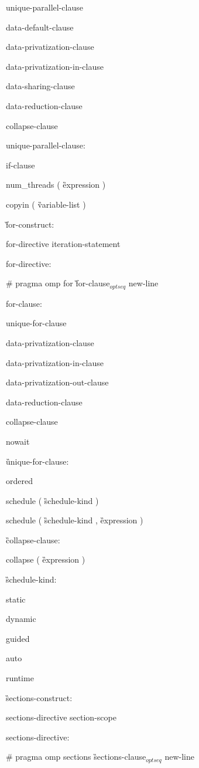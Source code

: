 {\I unique-parallel-clause

\I data-default-clause 

\I data-privatization-clause 

\I data-privatization-in-clause 

\I data-sharing-clause 

\I data-reduction-clause 

\I collapse-clause

unique-parallel-clause:

\I if-clause

\C\I num\_threads ( \G expression \C )

\C\I copyin ( \G variable-list \C )

\G for-construct:

\I for-directive iteration-statement

for-directive:

\C\I \# pragma omp for \G for-clause$_{optseq}$ new-line

for-clause:

\I unique-for-clause

\I data-privatization-clause 

\I data-privatization-in-clause 

\I data-privatization-out-clause 

\I data-reduction-clause 

\I collapse-clause

\C\I nowait

\G unique-for-clause:

\C\I ordered

\I schedule ( \G schedule-kind \C )

\I schedule ( \G schedule-kind \C, \G expression \C )

\G collapse-clause:

\C\I collapse ( \G expression \C )

\G schedule-kind:

\C\I static

\I dynamic

\I guided

\I auto

\I runtime

\G sections-construct:

\I sections-directive section-scope

sections-directive:

\C\I \# pragma omp sections \G sections-clause$_{optseq}$ new-line

}
